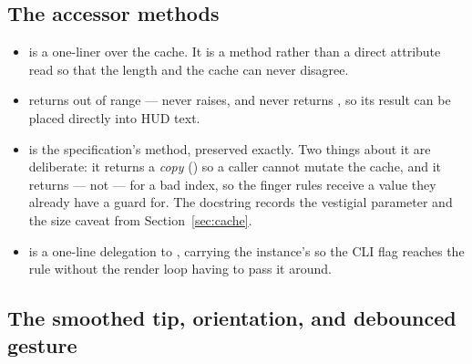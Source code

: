 \subsection{The accessor methods}

\begin{codecard}

\end{codecard}

\begin{itemize}
  \item \textbf{} is a one-liner over the cache. It is a method rather than a
        direct attribute read so that the length and the cache can never disagree.
  \item \textbf{} returns  out of range --- never raises, and never
        returns , so its result can be placed directly into HUD text.
  \item \textbf{} is the specification's method, preserved exactly. Two things
        about it are deliberate: it returns a \emph{copy} () so a caller cannot
        mutate the cache, and it returns \code{[]} --- not  --- for a bad index, so the
        finger rules receive a value they already have a guard for. The docstring records the
        vestigial  parameter and the size caveat from Section~\ref{sec:cache}.
  \item \textbf{} is a one-line delegation to , carrying the
        instance's  so the CLI flag reaches the rule without the render loop having
        to pass it around.
\end{itemize}

\subsection{The smoothed tip, orientation, and debounced gesture}

\begin{codecard}

\end{codecard}

